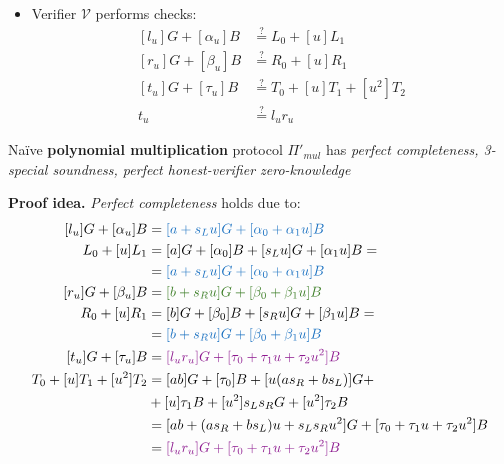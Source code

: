 \documentclass[../../book.tex]{subfiles}
\begin{document}
\begin{itemize}
\begin{equation}
\begin{aligned}
                t_u &= l_u r_u & \tau_u &= \tau_0 + \tau_1 u + \tau_2 u^2
            \end{aligned}
        \end{equation}
        and sends $(l_u, r_u, t_u, \alpha_u, \beta_u, \tau_u)$ to $\mathcal{V}$.
    \item Verifier $\mathcal{V}$ performs checks: 
        \begin{equation}
            \begin{aligned}
                [l_u]G + [\alpha_u]B &\stackrel{\text{?}}{=} L_0 + [u]L_1 \\
                [r_u]G + [\beta_u]B &\stackrel{\text{?}}{=} R_0 + [u]R_1 \\
                [t_u]G + [\tau_u]B &\stackrel{\text{?}}{=} T_0 + [u]T_1 + [u^2]T_2 \\
                t_u &\stackrel{\text{?}}{=} l_u r_u
            \end{aligned}
        \end{equation}
\end{itemize}
\begin{theorem}
    Naïve \textbf{polynomial multiplication} protocol $\Pi'_{mul}$ has \textit{perfect completeness, 3-special soundness, perfect honest-verifier zero-knowledge}
    \label{th:poly_mul_naive}
\end{theorem}
\textbf{Proof idea.} \textit{Perfect completeness} holds due to:
\begin{equation*}
    \begin{aligned} %
        [l_u]G + [\alpha_u]B &= \textcolor{RoyalBlue}{[a + s_L u]G + [\alpha_0 + \alpha_1 u]B} \\
        L_0 + [u]L_1 &= [a]G + [\alpha_0]B + [s_L u]G + [\alpha_1 u]B = \\
        &= \textcolor{RoyalBlue}{[a + s_L u]G + [\alpha_0 + \alpha_1 u]B} \\
        [r_u]G + [\beta_u]B &= \textcolor{OliveGreen}{[b + s_R u]G + [\beta_0 + \beta_1 u]B} \\
        R_0 + [u]R_1 &= [b]G + [\beta_0]B + [s_R u]G + [\beta_1 u]B = \\ 
        &= \textcolor{RoyalBlue}{[b + s_R u]G + [\beta_0 + \beta_1 u]B}\\
        [t_u]G + [\tau_u]B &= \textcolor{Plum}{[l_u r_u]G + [\tau_0 + \tau_1 u + \tau_2 u^2]B} \\
        T_0 + [u]T_1 + [u^2]T_2 &= [ab]G + [\tau_0]B + [u(as_R + bs_L)]G + \\
        &+[u]\tau_1 B + [u^2]s_L s_R G + [u^2]\tau_2 B \\
            &= [ab + (as_R + bs_L)u + s_L s_R u^2]G + [\tau_0 + \tau_1 u + \tau_2 u^2]B \\
            &= \textcolor{Plum}{[l_u r_u]G + [\tau_0 + \tau_1 u + \tau_2 u^2]B}
    \end{aligned}
\end{equation*}
\end{document}
